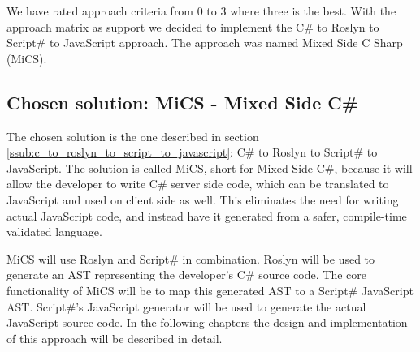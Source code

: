 	We have rated approach criteria from 0 to 3 where three is the best. With the approach matrix as support we decided to implement the C\# to Roslyn to Script\# to JavaScript approach. The approach was named Mixed Side C Sharp (MiCS).

	\FloatBarrier

	\subsection{Chosen solution: MiCS - Mixed Side C\#} %
	\label{sub:mics_mixed_side_csharp}
	The chosen solution is the one described in section \ref{ssub:c_to_roslyn_to_script_to_javascript}: C\# to Roslyn to Script\# to JavaScript. The solution is called MiCS, short for Mixed Side C\#, because it will allow the developer to write C\# server side code, which can be translated to JavaScript and used on client side as well. This eliminates the need for writing actual JavaScript code, and instead have it generated from a safer, compile-time validated language.

	MiCS will use Roslyn and Script\# in combination. Roslyn will be used to generate an AST representing the developer's C\# source code. The core functionality of MiCS will be to map this generated AST to a Script\# JavaScript AST. Script\#'s JavaScript generator will be used to generate the actual JavaScript source code. In the following chapters the design and implementation of this approach will be described in detail.


